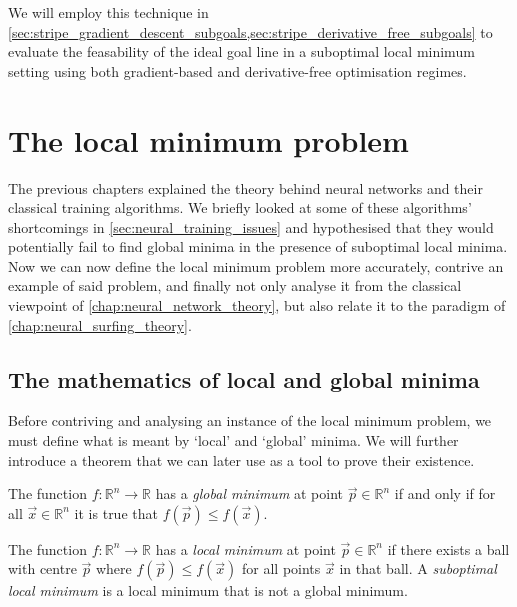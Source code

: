 We will employ this technique in \ref{sec:stripe_gradient_descent_subgoals,sec:stripe_derivative_free_subgoals} to evaluate the feasability of the ideal goal line in a suboptimal local minimum setting using both gradient-based and derivative-free optimisation regimes.

\chapter{The local minimum problem}
\label{chap:local_minimum_problem}
The previous chapters explained the theory behind neural networks and their classical training algorithms. 
We briefly looked at some of these algorithms' shortcomings in \ref{sec:neural_training_issues} and hypothesised that they would potentially fail to find global minima in the presence of suboptimal local minima.
Now we can now define the local minimum problem more accurately, contrive an example of said problem, and finally not only analyse it from the classical viewpoint of \ref{chap:neural_network_theory}, but also relate it to the paradigm of \ref{chap:neural_surfing_theory}.

\section{The mathematics of local and global minima}
Before contriving and analysing an instance of the local minimum problem, we must define what is meant by `local' and `global' minima.
We will further introduce a theorem that we can later use as a tool to prove their existence.
\begin{definition}
    \label{def:global_minimum}
    The function $f: \mathbb{R}^n \rightarrow \mathbb{R}$ has a \textit{global minimum} at point
    $\vec{p} \in \mathbb{R}^n$
    if and only if for all
    $\vec{x} \in \mathbb{R}^n$
    it is true that
    $f(\vec{p}) \leq f(\vec{x})$.
\end{definition}

\begin{definition}
    \label{def:local_minimum}
    The function $f: \mathbb{R}^n \rightarrow \mathbb{R}$ has a \textit{local minimum} at point
    $\vec{p} \in \mathbb{R}^n$
    if there exists a ball with centre
    $\vec{p}$
    where
    $f(\vec{p}) \leq f(\vec{x})$
    for all points $\vec{x}$ in that ball.
    A \textit{suboptimal local minimum} is a local minimum that is not a global minimum.
\end{definition}

